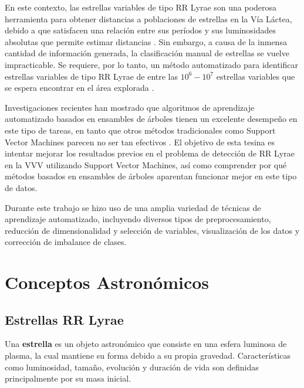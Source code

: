 \par En este contexto, las estrellas variables de tipo RR Lyrae son una poderosa herramienta para obtener distancias a poblaciones de estrellas en la Vía Láctea, debido a que satisfacen una relación entre sus períodos y sus luminosidades absolutas que permite estimar distancias \cite{Shapley} \cite{Baade}. Sin embargo, a causa de la inmensa cantidad de información generada, la clasificación manual de estrellas se vuelve impracticable. Se requiere, por lo tanto, un método automatizado para identificar estrellas variables de tipo RR Lyrae de entre las $10^6-10^7$ estrellas variables que se espera encontrar en el área explorada \cite{jbc}. \\

\par Investigaciones recientes han mostrado que algoritmos de aprendizaje automatizado basados en ensambles de árboles tienen un excelente desempeño en este tipo de tareas, en tanto que otros métodos tradicionales como Support Vector Machines parecen no ser tan efectivos \cite{elorrieta} \cite{jbc}. El objetivo de esta tesina es intentar mejorar los resultados previos en el problema de detección de RR Lyrae en la VVV utilizando Support Vector Machines, así como comprender por qué métodos basados en ensambles de árboles aparentan funcionar mejor en este tipo de datos.  \\

\par Durante este trabajo se hizo uso de una amplia variedad de técnicas de aprendizaje automatizado, incluyendo diversos tipos de preprocesamiento, reducción de dimensionalidad y selección de variables, visualización de los datos y corrección de imbalance de clases. 

\section {Conceptos Astronómicos}

\subsection{Estrellas RR Lyrae}

\par Una \textbf{estrella} es un objeto astronómico que consiste en una esfera luminosa de plasma, la cual mantiene su forma debido a su propia gravedad. Características como luminosidad, tamaño, evolución y duración de vida son definidas principalmente por su masa inicial. \\

